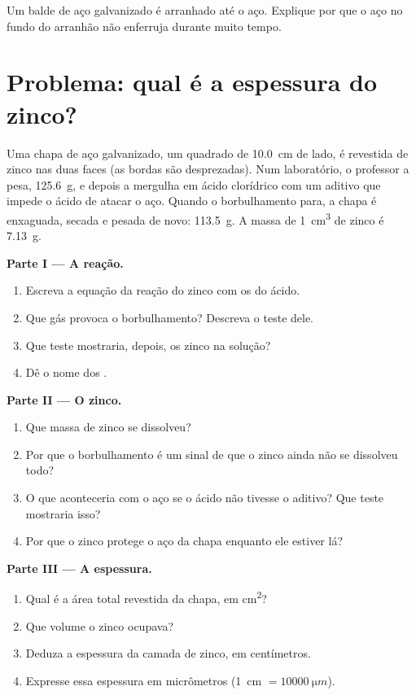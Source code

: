 \begin{exercise}[$\star\star\star$]\label{exo:g9:metals-acids-corrosion:12}
Um balde de aço galvanizado é arranhado até o aço. Explique por que o aço
no fundo do arranhão não enferruja durante muito tempo.
\end{exercise}

\section{Problema: qual é a espessura do zinco?}

\begin{problem}
\label{pb:g9:metals-acids-corrosion:1}
Uma chapa de aço galvanizado, um quadrado de \qty{10.0}{cm} de lado, é
revestida de zinco nas duas faces (as bordas são desprezadas). Num
laboratório, o professor a pesa, \qty{125.6}{g}, e depois a mergulha em
ácido clorídrico com um aditivo que impede o ácido de atacar o aço.
Quando o borbulhamento para, a chapa é enxaguada, secada e pesada de
novo: \qty{113.5}{g}. A massa de \qty{1}{cm^3} de zinco é \qty{7.13}{g}.

\medskip
\noindent\textbf{Parte I --- A reação.}
\begin{enumerate}
  \item Escreva a equação da reação do zinco com os   do
        ácido.
  \item Que gás provoca o borbulhamento? Descreva o teste dele.
  \item Que teste mostraria, depois, os  zinco na solução?
  \item Dê o nome dos .
\end{enumerate}

\medskip
\noindent\textbf{Parte II --- O zinco.}
\begin{enumerate}[resume]
  \item Que massa de zinco se dissolveu?
  \item Por que o borbulhamento é um sinal de que o zinco ainda não se
        dissolveu todo?
  \item O que aconteceria com o aço se o ácido não tivesse o aditivo? Que
        teste mostraria isso?
  \item Por que o zinco protege o aço da chapa enquanto ele estiver lá?
\end{enumerate}

\medskip
\noindent\textbf{Parte III --- A espessura.}
\begin{enumerate}[resume]
  \item Qual é a área total revestida da chapa, em \unit{cm^2}?
  \item Que volume o zinco ocupava?
  \item Deduza a espessura da camada de zinco, em centímetros.
  \item Expresse essa espessura em micrômetros
        (\qty{1}{cm} $= \qty{10000}{\micro m}$).
\end{enumerate}
\end{problem}
